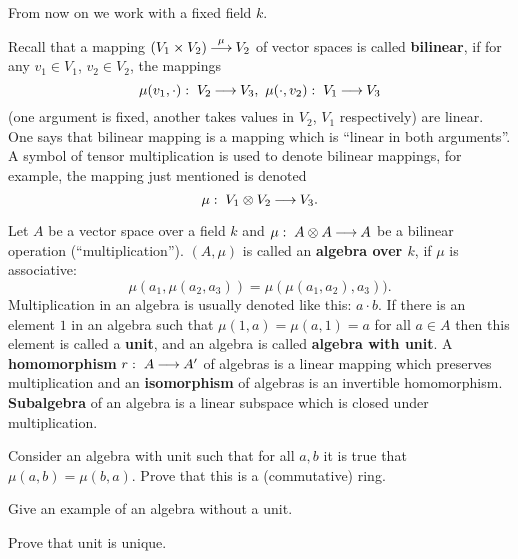 \documentclass[12pt]{article}
\begin{document}




From now on we work with a fixed field $k$. 

Recall that a mapping $(V_1\times V_2) \overset{\mu}{{\:\longrightarrow\:}}
V_2$ of vector spaces is called {\bf bilinear}, if for any
$v_1\in V_1$, $v_2 \in V_2$, the mappings
\[ 
\mu(v_1, \cdot ):\; V_2 {\:\longrightarrow\:} V_3, \ \mu(\cdot, v_2):\; V_1 {\:\longrightarrow\:} V_3
\]
(one argument is fixed, another takes values in $V_2$, $V_1$
respectively) are linear. One says that bilinear mapping is a
mapping which is ``linear in both arguments''.  A symbol of tensor
multiplication is used to denote bilinear mappings, for example, the
mapping just mentioned is denoted
\[ 
\mu:\; V_1\otimes V_2 {\:\longrightarrow\:} V_3.
\]

\begin{opredelenie}
Let $A$ be a vector space over a field $k$ and $\mu:\; A
\otimes A {\:\longrightarrow\:} A$ be a bilinear operation (``multiplication'').  $(A, \mu)$
is called an {\bf algebra over $k$}, if $\mu$ is associative:
\[
\mu(a_1, \mu(a_2, a_3)) = \mu(\mu(a_1, a_2), a_3)).
\]
Multiplication in an algebra is usually denoted like this: $a\cdot
b$. If there is an element $1$ in an algebra such that $\mu(1,a) =
\mu(a,1) =a$ for all $a\in A$ then this element is called a  {\bf
  unit}, and an algebra is called {\bf algebra with unit}. A {\bf
  homomorphism} $r:\; A {\:\longrightarrow\:} A'$ of algebras is a linear mapping
which preserves multiplication and an {\bf isomorphism} of algebras is
an invertible homomorphism.  {\bf Subalgebra} of an algebra is a
linear subspace which is closed under multiplication.
\end{opredelenie}

\begin{zadacha} 
Consider an algebra with unit such that for all $a,b$ it is true that 
$\mu(a,b) = \mu(b,a)$. Prove that this is a (commutative) ring.
\end{zadacha}

\begin{zadacha} 
Give an example of an algebra without a unit.
\end{zadacha}

\begin{zadacha}
Prove that unit is unique.
\end{zadacha}
\end{document}
